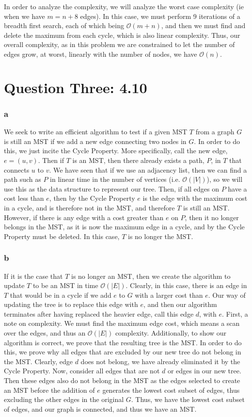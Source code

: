 \documentclass[11pt,letterpaper]{article}
\begin{document}
In order to analyze the complexity, we will analyze the worst case complexity (ie when we have $m = n+8$ edges). In this case, we must perform 9 iterations of a breadth first search, each of which being $\mathcal{O}(m+n)$, and then we must find and delete the maximum from each cycle, which is also linear complexity. Thus, our overall complexity, as in this problem we are constrained to let the number of edges grow, at worst, linearly with the number of nodes, we have $\mathcal{O}(n)$. 


\section*{Question Three: 4.10}
\subsubsection*{a}
We seek to write an efficient algorithm to test if a given MST $T$ from a graph $G$ is still an MST if we add a new edge connecting two nodes in $G$. In order to do this, we just incite the Cycle Property. More specifically, call the new edge, $e = (u,v)$. Then if $T$ is an MST, then there already exists a path, $P$, in $T$ that connects $u$ to $v$. We have seen that if we use an adjacency list, then we can find a path such as $P$ in linear time in the number of vertices (i.e. $\mathcal{O}(|V|)$), so we will use this as the data structure to represent our tree. Then, if all edges on $P$ have a cost less than $e$, then by the Cycle Property $e$ is the edge with the maximum cost in a cycle, and is therefore not in the MST, and therefore $T$ is still an MST. However, if there is any edge with a cost greater than $e$ on $P$, then it no longer belongs in the MST, as it is now the maximum edge in a cycle, and by the Cycle Property must be deleted. In this case, $T$ is no longer the MST. 

\subsubsection*{b} If it is the case that $T$ is no longer an MST, then we create the algorithm to update $T$ to be an MST in time $\mathcal{O}(|E|)$. Clearly, in this case, there is an edge in $T$ that would be in a cycle if we add $e$ to $G$ with a larger cost than $e$. Our way of updating the tree is to replace this edge with $e$, and then our algorithm terminates after having replaced the heavier edge, call this edge $d$, with $e$. First, a note on complexity. We must find the maximum edge cost, which means a scan over the edges, and thus an $\mathcal{O}(|E|)$ complexity. Additionally, to show our algorithm is correct, we prove that the resulting tree is the MST. In order to do this, we prove why all edges that are excluded by our new tree do not belong in the MST. Clearly, edge $d$ does not belong, we have already eliminated it by the Cycle Property. Now, consider all edges that are not $d$ or edges in our new tree. Then these edges also do not belong in the MST as the edges selected to create an MST before the addition of $e$ generates the lowest cost subset of edges, thus excluding the other edges in the original $G$. Thus, we have the lowest cost subset of edges, and our graph is connected, and thus we have an MST. 
\end{document}
